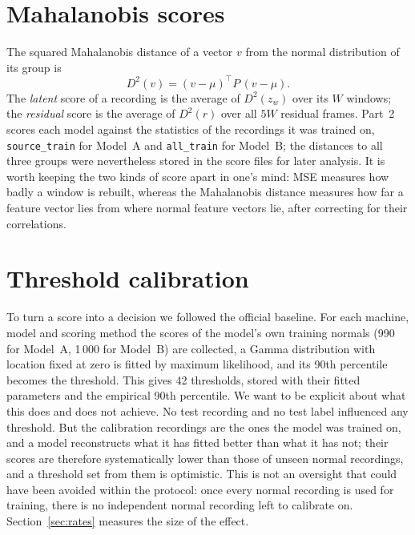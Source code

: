 \section{Mahalanobis scores}
The squared Mahalanobis distance \cite{mahalanobis1936} of a vector $v$ from the normal distribution of its group is
\begin{equation}
D^2(v) = (v-\mu)^{\top} P\,(v-\mu).
\label{eq:maha}
\end{equation}
The \emph{latent} score of a recording is the average of $D^2(z_w)$ over its $W$ windows; the \emph{residual} score is the average of $D^2(r)$ over all $5W$ residual frames. Part~2 scores each model against the statistics of the recordings it was trained on, \texttt{source\_train} for Model~A and \texttt{all\_train} for Model~B; the distances to all three groups were nevertheless stored in the score files for later analysis. It is worth keeping the two kinds of score apart in one's mind: MSE measures how badly a window is rebuilt, whereas the Mahalanobis distance measures how far a feature vector lies from where normal feature vectors lie, after correcting for their correlations.

\section{Threshold calibration}
To turn a score into a decision we followed the official baseline. For each machine, model and scoring method the scores of the model's own training normals (990 for Model~A, 1\,000 for Model~B) are collected, a Gamma distribution with location fixed at zero is fitted by maximum likelihood, and its 90th percentile becomes the threshold. This gives 42 thresholds, stored with their fitted parameters and the empirical 90th percentile. We want to be explicit about what this does and does not achieve. No test recording and no test label influenced any threshold. But the calibration recordings are the ones the model was trained on, and a model reconstructs what it has fitted better than what it has not; their scores are therefore systematically lower than those of unseen normal recordings, and a threshold set from them is optimistic. This is not an oversight that could have been avoided within the protocol: once every normal recording is used for training, there is no independent normal recording left to calibrate on. Section~\ref{sec:rates} measures the size of the effect.
